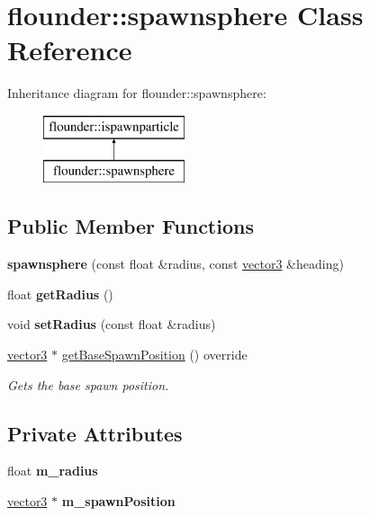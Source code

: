 \hypertarget{classflounder_1_1spawnsphere}{}\section{flounder\+:\+:spawnsphere Class Reference}
\label{classflounder_1_1spawnsphere}
Inheritance diagram for flounder\+:\+:spawnsphere\+:\begin{figure}[H]
\begin{center}
\leavevmode
\includegraphics[height=2.000000cm]{classflounder_1_1spawnsphere}
\end{center}
\end{figure}
\subsection*{Public Member Functions}
\begin{DoxyCompactItemize}
\item 
\mbox{\label{classflounder_1_1spawnsphere_a67983cdd0478ca93c705ec9d7d62b35d}} 
{\bfseries spawnsphere} (const float \&radius, const \hyperlink{classflounder_1_1vector3}{vector3} \&heading)
\item 
\mbox{\label{classflounder_1_1spawnsphere_abdf339c5f66b7885dd4b0568840d210e}} 
float {\bfseries get\+Radius} ()
\item 
\mbox{\label{classflounder_1_1spawnsphere_ad7a5955de8553a6e683d01e4d9648225}} 
void {\bfseries set\+Radius} (const float \&radius)
\item 
\hyperlink{classflounder_1_1vector3}{vector3} $\ast$ \hyperlink{classflounder_1_1spawnsphere_ac5ae227a5bff13da4e0fac4ba4debdd4}{get\+Base\+Spawn\+Position} () override
\begin{DoxyCompactList}\small\item\em Gets the base spawn position. \end{DoxyCompactList}\end{DoxyCompactItemize}
\subsection*{Private Attributes}
\begin{DoxyCompactItemize}
\item 
\mbox{\label{classflounder_1_1spawnsphere_abc02ab3a7f12087e7a25b2a41492fb2c}} 
float {\bfseries m\+\_\+radius}
\item 
\mbox{\label{classflounder_1_1spawnsphere_a50221f1f6d860a21c9fb5119924fded0}} 
\hyperlink{classflounder_1_1vector3}{vector3} $\ast$ {\bfseries m\+\_\+spawn\+Position}
\end{DoxyCompactItemize}


